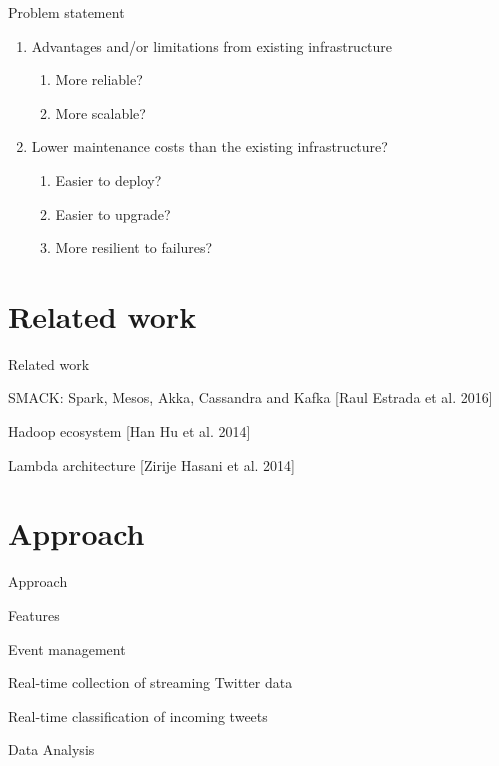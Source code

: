 \documentclass{beamer}
\newenvironment{wideitemize}{\itemize\addtolength{\itemsep}{20pt}}{\enditemize}
\newcommand{\hugeframe}[1]{
\begin{frame}[c]
  \begin{center}
    \huge\textcolor{title}{#1}
  \end{center}

\end{frame}
}
\begin{document}
\begin{frame}{Problem statement}


\begin{enumerate}
  \item Advantages and/or limitations from existing infrastructure
  \begin{enumerate}
    \item More reliable?
    \item More scalable?
  \end{enumerate}
  \item Lower maintenance costs than the existing infrastructure?
  \begin{enumerate}
    \item Easier to deploy?
    \item Easier to upgrade?
    \item More resilient to failures?
  \end{enumerate}
\end{enumerate}

\end{frame}

\section{Related work}

\begin{frame}{Related work}
\begin{wideitemize}
  \item SMACK: Spark, Mesos, Akka, Cassandra and Kafka [Raul Estrada et al. 2016]
  \item Hadoop ecosystem [Han Hu et al. 2014]
  \item Lambda architecture [Zirije Hasani et al. 2014]
\end{wideitemize}
\end{frame}

\section{Approach}
\hugeframe{Approach}

\begin{frame}{Features}

\begin{wideitemize}
  \item Event management
  \item Real-time collection of streaming Twitter data
  \item Real-time classification of incoming tweets
  \item Data Analysis
\end{wideitemize}

\end{frame}
\end{document}
